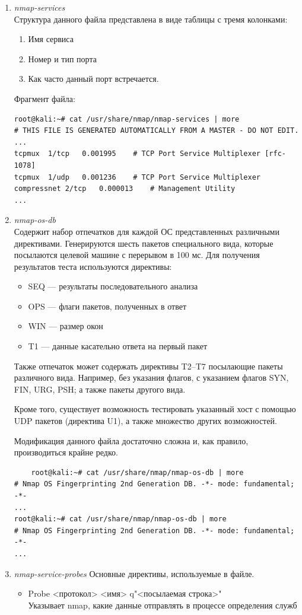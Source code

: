 \documentclass[utf8x, 12pt]{G7-32}
\begin{document}
\begin{enumerate}
	\item {\it nmap-services}\\
		Структура данного файла представлена в виде таблицы с тремя колонками:
\begin{enumerate}
	\item Имя сервиса
	\item Номер и тип порта
	\item Как часто данный порт встречается.
\end{enumerate}	

	\bigskip
Фрагмент файла:
\begin{lstlisting}
root@kali:~# cat /usr/share/nmap/nmap-services | more
# THIS FILE IS GENERATED AUTOMATICALLY FROM A MASTER - DO NOT EDIT.
...
tcpmux	1/tcp	0.001995	# TCP Port Service Multiplexer [rfc-1078]
tcpmux	1/udp	0.001236	# TCP Port Service Multiplexer
compressnet	2/tcp	0.000013	# Management Utility
...
\end{lstlisting}
	
	
	\item {\it nmap-os-db}\\
	Содержит набор отпечатков для каждой ОС представленных различными директивами.
Генерируются шесть пакетов специального вида, которые посылаются целевой машине с перерывом в 100 мс. Для получения результатов теста используются директивы:

\begin{itemize}
	\item SEQ --- результаты последовательного анализа
	\item OPS --- флаги пакетов, полученных в ответ
	\item WIN --- размер окон
	\item T1 --- данные касательно ответа на первый пакет
\end{itemize}
	\bigskip
	Также отпечаток может содержать директивы T2--T7 посылающие пакеты различного вида. Например, без указания флагов, с указанием флагов SYN, FIN, URG, PSH; а также пакеты другого вида.
	
	Кроме того, существует возможность тестировать указанный хост с помощью UDP пакетов (директива U1), а также множество других возможностей.

	Модификация данного файла достаточно сложна и, как правило, производиться крайне редко.
\begin{lstlisting}	
	root@kali:~# cat /usr/share/nmap/nmap-os-db | more
# Nmap OS Fingerprinting 2nd Generation DB. -*- mode: fundamental; -*-
...
root@kali:~# cat /usr/share/nmap/nmap-os-db | more
# Nmap OS Fingerprinting 2nd Generation DB. -*- mode: fundamental; -*-
...
\end{lstlisting}
	\item {\it nmap-service-probes}
	Основные директивы, используемые в файле.	
	\begin{itemize}
		\item Probe <протокол> <имя> q"<посылаемая строка>"\\
			Указывает nmap, какие данные отправлять в процессе определения служб
	

\end{itemize}
\end{enumerate}
\end{document}
